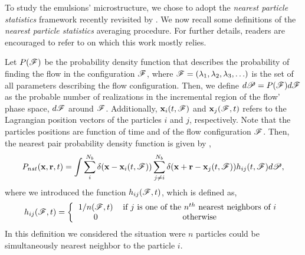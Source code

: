 
To study the emulsions' microstructure, we chose to adopt the \textit{nearest particle statistics} framework recently revisited by \citet{zhang2021ensemble}.
We now recall some definitions of the \textit{nearest particle statistics} averaging procedure. 
For further details, readers are encouraged to refer to \citet{zhang2023evolution} on which this work mostly relies.

Let $P(\mathscr{F})$ be the probability density function that describes the probability of finding the flow in the configuration $\mathscr{F}$, where $\mathscr{F} = (\lambda_1,\lambda_2,\lambda_3,\ldots)$ is the set of all parameters describing the flow configuration.
Then, we define $d\mathscr{P} = P(\mathscr{F})d\mathscr{F}$ as the probable number of realizations in the incremental region of the flow' phase space, $d\mathscr{F}$ around $\mathscr{F}$.
Additionally,  $\textbf{x}_i(t,\mathscr{F})$ and $\textbf{x}_j(\mathscr{F},t)$ refers to the Lagrangian position vectors of the particles $i$ and $j$, respectively. 
Note that the particles positions are function of time and of the flow configuration $\mathscr{F}$. 
Then, the nearest pair probability density function is given by \citep{zhang2021ensemble,zhang2023evolution},
\begin{equation}
    P_{nst}(\textbf{x},\textbf{r},t)= 
    \int \sum_{i}^{N_b}\delta(\textbf{x}-\textbf{x}_i(t,\mathscr{F}))
    \sum_{j\neq i}^{N_b}\delta(\textbf{x}+\textbf{r}-\textbf{x}_j(t,\mathscr{F})) 
    h_{ij} (t,\mathscr{F})
    d\mathscr{P},
    \label{eq:P_nstij}
\end{equation}
where we introduced the function $h_{ij}(\mathscr{F},t)$, which is defined as,
\begin{equation*}
    h_{ij}(\FF,t)
    = \left\{
        \begin{tabular}{cc}
            $1/n(\FF,t)$ & if $j$ is one of the $n^{th}$ nearest neighbors of $i$ \\
            0& otherwise
        \end{tabular}
        \right.
\end{equation*}
In this definition we considered the situation were $n$ particles could be simultaneously nearest neighbor to the particle $i$. 
